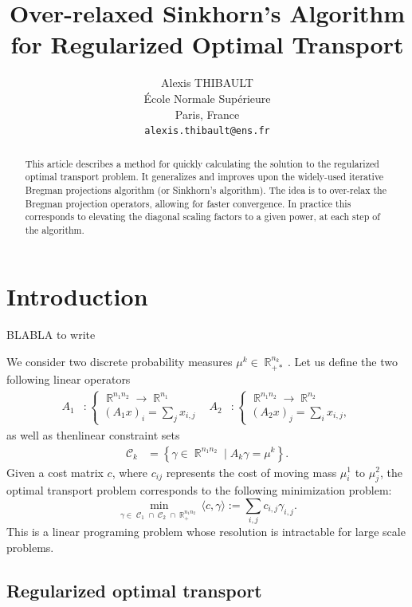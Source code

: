 \documentclass{article} %
\title{Over-relaxed Sinkhorn's Algorithm for Regularized Optimal Transport}
\author{
Alexis THIBAULT\\
\'Ecole Normale Sup\'erieure\\
Paris, France\\
\texttt{alexis.thibault@ens.fr}
}
\DeclareMathOperator{\IR}{\mathbb{R}}
\DeclareMathOperator{\Ccal}{\mathcal{C}}
\theoremstyle{plain}
\theoremstyle{definition}
\theoremstyle{remark}
\begin{document}
\maketitle

\begin{abstract}
This article describes a method for quickly calculating the solution to the regularized optimal transport problem. It generalizes and improves upon the widely-used iterative Bregman projections algorithm (or Sinkhorn's algorithm). The idea is to over-relax the Bregman projection operators, allowing for faster convergence. In practice this corresponds to elevating the diagonal scaling factors to a given power, at each step of the algorithm.
\end{abstract}

\section{Introduction}
BLABLA to write


We consider two discrete probability measures $\mu^k \in \IR_{+*}^{n_k}$.
Let us define the two following linear operators
\begin{align*}
A_1 &: \begin{cases}
\IR^{n_1 n_2} \rightarrow \IR^{n_1} \\
(A_1 x)_i = \sum_j x_{i,j}
\end{cases} &
A_2 &: \begin{cases}
\IR^{n_1 n_2} \rightarrow \IR^{n_2}\\
(A_2 x)_j = \sum_i x_{i,j},
\end{cases}
\end{align*}
as well as thenlinear  constraint sets
\begin{align*}
\Ccal_k &= \left\{ \gamma\in\IR^{n_1 n_2} \mid A_k \gamma = \mu^k \right\}.
\end{align*}
Given a cost matrix $c$, where $c_{ij}$ represents the cost of moving mass $\mu^1_i$ to $\mu^2_j$,  the optimal transport problem corresponds to the following minimization problem:
$$\min_{\gamma\in\Ccal_1\cap \Ccal_2\cap \IR^{n_1 n_2}_+} \langle c,\gamma\rangle:=\sum_{i,j}c_{i,j}\gamma_{i,j}.$$
This is a linear programing problem whose resolution is intractable for large scale problems. 

\subsection{Regularized optimal transport}
\end{document}
